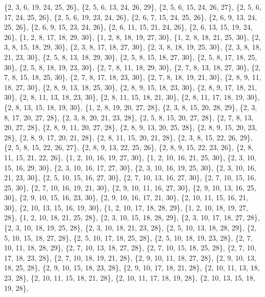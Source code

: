 \documentclass[11pt,a4paper]{article}
\begin{document}
{\{2, 3, 6, 19, 24, 25, 26\}, \{2, 5, 6, 13, 24, 26, 29\}, \{2, 5, 6, 15, 24, 26, 27\}, \{2, 5, 6, 17, 24, 25, 26\}, \{2, 5, 6, 19, 23, 24, 26\},
\{2, 6, 7, 15, 24, 25, 26\}, \{2, 6, 9, 13, 24, 25, 26\}, \{2, 6, 9, 15, 23, 24, 26\}, \{2, 6, 11, 15, 21, 24, 26\}, \{2, 6, 13, 15, 19, 24, 26\},
\{1, 2, 8, 17, 18, 29, 30\}, \{1, 2, 8, 18, 19, 27, 30\}, \{1, 2, 8, 18, 21, 25, 30\}, \{2, 3, 8, 15, 18, 29, 30\}, \{2, 3, 8, 17, 18, 27, 30\},
\{2, 3, 8, 18, 19, 25, 30\}, \{2, 3, 8, 18, 21, 23, 30\}, \{2, 5, 8, 13, 18, 29, 30\}, \{2, 5, 8, 15, 18, 27, 30\}, \{2, 5, 8, 17, 18, 25, 30\},
\{2, 5, 8, 18, 19, 23, 30\}, \{2, 7, 8, 11, 18, 29, 30\}, \{2, 7, 8, 13, 18, 27, 30\}, \{2, 7, 8, 15, 18, 25, 30\}, \{2, 7, 8, 17, 18, 23, 30\},
\{2, 7, 8, 18, 19, 21, 30\}, \{2, 8, 9, 11, 18, 27, 30\}, \{2, 8, 9, 13, 18, 25, 30\}, \{2, 8, 9, 15, 18, 23, 30\}, \{2, 8, 9, 17, 18, 21, 30\},
\{2, 8, 11, 13, 18, 23, 30\}, \{2, 8, 11, 15, 18, 21, 30\}, \{2, 8, 11, 17, 18, 19, 30\}, \{2, 8, 13, 15, 18, 19, 30\}, \{1, 2, 8, 19, 20, 27, 28\},
\{2, 3, 8, 15, 20, 28, 29\}, \{2, 3, 8, 17, 20, 27, 28\}, \{2, 3, 8, 20, 21, 23, 28\}, \{2, 5, 8, 15, 20, 27, 28\}, \{2, 7, 8, 13, 20, 27, 28\},
\{2, 8, 9, 11, 20, 27, 28\}, \{2, 8, 9, 13, 20, 25, 28\}, \{2, 8, 9, 15, 20, 23, 28\}, \{2, 8, 9, 17, 20, 21, 28\}, \{2, 8, 11, 15, 20, 21, 28\},
\{2, 3, 8, 15, 22, 26, 29\}, \{2, 5, 8, 15, 22, 26, 27\}, \{2, 8, 9, 13, 22, 25, 26\}, \{2, 8, 9, 15, 22, 23, 26\}, \{2, 8, 11, 15, 21, 22, 26\},
\{1, 2, 10, 16, 19, 27, 30\}, \{1, 2, 10, 16, 21, 25, 30\}, \{2, 3, 10, 15, 16, 29, 30\}, \{2, 3, 10, 16, 17, 27, 30\}, \{2, 3, 10, 16, 19, 25, 30\},
\{2, 3, 10, 16, 21, 23, 30\}, \{2, 5, 10, 15, 16, 27, 30\}, \{2, 7, 10, 13, 16, 27, 30\}, \{2, 7, 10, 15, 16, 25, 30\}, \{2, 7, 10, 16, 19, 21, 30\},
\{2, 9, 10, 11, 16, 27, 30\}, \{2, 9, 10, 13, 16, 25, 30\}, \{2, 9, 10, 15, 16, 23, 30\}, \{2, 9, 10, 16, 17, 21, 30\}, \{2, 10, 11, 15, 16, 21, 30\},
\{2, 10, 13, 15, 16, 19, 30\}, \{1, 2, 10, 17, 18, 28, 29\}, \{1, 2, 10, 18, 19, 27, 28\}, \{1, 2, 10, 18, 21, 25, 28\}, \{2, 3, 10, 15, 18, 28, 29\},
\{2, 3, 10, 17, 18, 27, 28\}, \{2, 3, 10, 18, 19, 25, 28\}, \{2, 3, 10, 18, 21, 23, 28\}, \{2, 5, 10, 13, 18, 28, 29\}, \{2, 5, 10, 15, 18, 27, 28\},
\{2, 5, 10, 17, 18, 25, 28\}, \{2, 5, 10, 18, 19, 23, 28\}, \{2, 7, 10, 11, 18, 28, 29\}, \{2, 7, 10, 13, 18, 27, 28\}, \{2, 7, 10, 15, 18, 25, 28\},
\{2, 7, 10, 17, 18, 23, 28\}, \{2, 7, 10, 18, 19, 21, 28\}, \{2, 9, 10, 11, 18, 27, 28\}, \{2, 9, 10, 13, 18, 25, 28\}, \{2, 9, 10, 15, 18, 23, 28\},
\{2, 9, 10, 17, 18, 21, 28\}, \{2, 10, 11, 13, 18, 23, 28\}, \{2, 10, 11, 15, 18, 21, 28\}, \{2, 10, 11, 17, 18, 19, 28\}, \{2, 10, 13, 15, 18, 19, 28\},
}
\end{document}

